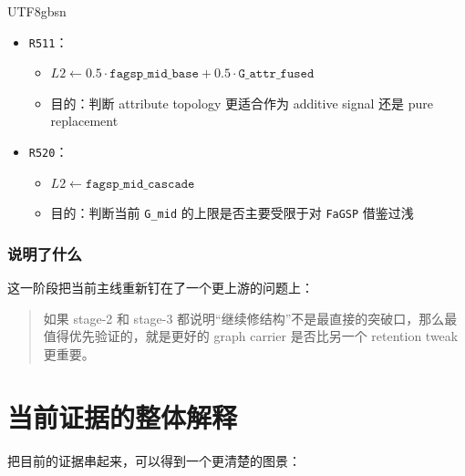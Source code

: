 \documentclass[11pt]{article}
\begin{document}
\begin{CJK*}{UTF8}{gbsn}
\begin{itemize}
  \item \texttt{R511}：
  \begin{itemize}
    \item \(L2 \leftarrow 0.5 \cdot \texttt{fagsp\_mid\_base} + 0.5 \cdot \texttt{G\_attr\_fused}\)
    \item 目的：判断 attribute topology 更适合作为 additive signal 还是 pure replacement
  \end{itemize}
  \item \texttt{R520}：
  \begin{itemize}
    \item \(L2 \leftarrow \texttt{fagsp\_mid\_cascade}\)
    \item 目的：判断当前 \texttt{G\_mid} 的上限是否主要受限于对 \texttt{FaGSP} 借鉴过浅
  \end{itemize}
\end{itemize}

\subsubsection*{说明了什么}

这一阶段把当前主线重新钉在了一个更上游的问题上：

\begin{quote}
如果 stage-2 和 stage-3 都说明“继续修结构”不是最直接的突破口，那么最值得优先验证的，就是更好的 graph carrier 是否比另一个 retention tweak 更重要。
\end{quote}

\section{当前证据的整体解释}

把目前的证据串起来，可以得到一个更清楚的图景：


\end{CJK*}
\end{document}
